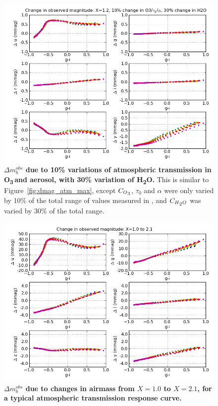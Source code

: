 \documentclass[12pt,preprint]{aastex}
\newcommand{\water}   {H\textsubscript{2}O}
\newcommand{\ozone}    {O\textsubscript{3}}
\begin{document}
\begin{figure}
\centering
\includegraphics[width=6in]{delta_mags_10}
\caption{{\small
{\bf $\Delta m_b^{obs}$ due to 10\% variations of 
atmospheric transmission in \ozone\,and aerosol, with 30\% variation of \water.} 
This is similar to Figure~\ref{fig:dmag_atm_max}, except $C_{\ozone}$,
$\tau_0$ and $\alpha$ were only varied by 10\% of the total range of
values measured in \citet{Burke2010b}, and $C_{\water}$ was varied by 30\%
of the total range. }}
\label{fig:dmag_atm_10}
\end{figure}


\begin{figure}
\centering
\includegraphics[width=6in]{delta_mags_airmass_big}
\caption{{\small
{\bf $\Delta m_b^{obs}$ due to changes in airmass from $X=1.0$ 
to $X=2.1$, for a typical atmospheric transmission response curve.}
}}
\label{fig:dmag_airmass}
\end{figure}
\end{document}
